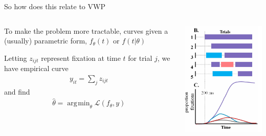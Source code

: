 \documentclass{beamer}
\DeclareMathOperator*{\argmin}{arg\!\min}
\begin{document}
\begin{frame}{So how does this relate to VWP}

\begin{columns}
\begin{column}{0.45\textwidth}
To make the problem more tractable, curves given a (usually) parametric form, $f_{\theta}(t)$ or $f(t| \theta)$ \\ \vspace{2mm}

Letting $z_{ijt}$ represent fixation at time $t$ for trial $j$, we have empirical curve
\begin{align*}
y_{it} = \sum_j z_{ijt}
\end{align*}
and find
\begin{align*}
\hat{\theta} = \argmin_{\theta} \mathcal{L}(f_{\theta}, y)
\end{align*}

\end{column}
\begin{column}{0.5\textwidth}  %
\begin{center}
\includegraphics[scale=0.5]{img/bob_aggregate.png}
\end{center}
\end{column}
\end{columns}
\end{frame}
\end{document}
